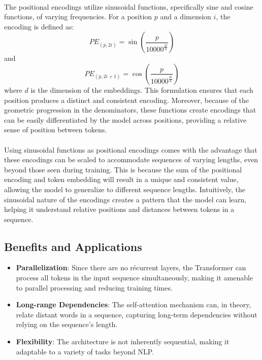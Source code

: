             \paragraph{}The positional encodings utilize sinusoidal functions, specifically sine and cosine functions, of varying frequencies. For a position \(p\) and a dimension \(i\), the encoding is defined as:
            \[
            PE_{(p, 2i)} = \sin\left(\frac{p}{10000^{\frac{2i}{d}}}\right)
            \]
            and
            \[
            PE_{(p, 2i+1)} = \cos\left(\frac{p}{10000^{\frac{2i}{d}}}\right)
            \]
            where \(d\) is the dimension of the embeddings. This formulation ensures that each position produces a distinct and consistent encoding. Moreover, because of the geometric progression in the denominators, these functions create encodings that can be easily differentiated by the model across positions, providing a relative sense of position between tokens.
            
            \paragraph{}Using sinusoidal functions as positional encodings comes with the advantage that these encodings can be scaled to accommodate sequences of varying lengths, even beyond those seen during training. This is because the sum of the positional encoding and token embedding will result in a unique and consistent value, allowing the model to generalize to different sequence lengths. Intuitively, the sinusoidal nature of the encodings creates a pattern that the model can learn, helping it understand relative positions and distances between tokens in a sequence.
            
        
        \subsection{Benefits and Applications}
        
            \begin{itemize}
                \item \textbf{Parallelization}: Since there are no récurrent layers, the Transformer can process all tokens in the input sequence simultaneously, making it amenable to parallel processing and reducing training times.
                \item \textbf{Long-range Dependencies}: The self-attention mechanism can, in theory, relate distant words in a sequence, capturing long-term dependencies without relying on the sequence's length.
                \item \textbf{Flexibility}: The architecture is not inherently sequential, making it adaptable to a variety of tasks beyond NLP.
            \end{itemize}
            

